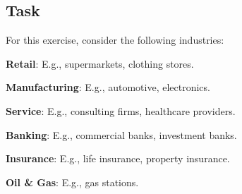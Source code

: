 \documentclass[12pt,a4paper]{memoir}
\begin{document}
\subsection*{Task}
For this exercise, consider the following industries:
\begin{compactitem}
    \item \textbf{Retail}: E.g., supermarkets, clothing stores.
    \item \textbf{Manufacturing}: E.g., automotive, electronics.
    \item \textbf{Service}: E.g., consulting firms, healthcare providers.
    \item \textbf{Banking}: E.g., commercial banks, investment banks.
    \item \textbf{Insurance}: E.g., life insurance, property insurance.
    \item \textbf{Oil \& Gas}: E.g., gas stations.
\end{compactitem}
\end{document}
